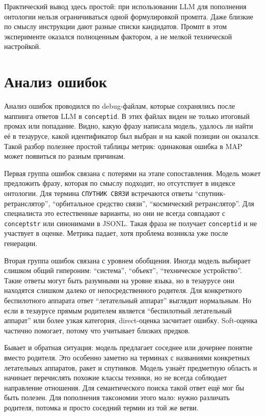 \documentclass[12pt,a4paper,oneside,openany]{report}
\begin{document}
Практический вывод здесь простой: при использовании LLM для пополнения онтологии нельзя ограничиваться одной формулировкой промпта. Даже близкие по смыслу инструкции дают разные списки кандидатов. Промпт в этом эксперименте оказался полноценным фактором, а не мелкой технической настройкой.

\chapter{Анализ ошибок}

Анализ ошибок проводился по debug-файлам, которые сохранялись после маппинга ответов LLM в \texttt{conceptid}. В этих файлах виден не только итоговый промах или попадание. Видно, какую фразу написала модель, удалось ли найти её в тезаурусе, какой идентификатор был выбран и на какой позиции он оказался. Такой разбор полезнее простой таблицы метрик: одинаковая ошибка в MAP может появиться по разным причинам.

Первая группа ошибок связана с потерями на этапе сопоставления. Модель может предложить фразу, которая по смыслу подходит, но отсутствует в индексе онтологии. Для термина \texttt{СПУТНИК СВЯЗИ} встречаются ответы ``спутник-ретранслятор'', ``орбитальное средство связи'', ``космический ретранслятор''. Для специалиста это естественные варианты, но они не всегда совпадают с \texttt{conceptstr} или синонимами в JSONL. Такая фраза не получает \texttt{conceptid} и не участвует в оценке. Метрика падает, хотя проблема возникла уже после генерации.

Вторая группа ошибок связана с уровнем обобщения. Иногда модель выбирает слишком общий гипероним: ``система'', ``объект'', ``техническое устройство''. Такие ответы могут быть разумными на уровне языка, но в тезаурусе они находятся слишком далеко от непосредственного родителя. Для конкретного беспилотного аппарата ответ ``летательный аппарат'' выглядит нормальным. Но если в тезаурусе прямым родителем является ``беспилотный летательный аппарат'' или более узкая категория, direct-оценка засчитает ошибку. Soft-оценка частично помогает, потому что учитывает близких предков.

Бывает и обратная ситуация: модель предлагает соседнее или дочернее понятие вместо родителя. Это особенно заметно на терминах с названиями конкретных летательных аппаратов, ракет и спутников. Модель узнаёт предметную область и начинает перечислять похожие классы техники, но не всегда соблюдает направление отношения. Для семантического поиска такой ответ ещё мог бы быть полезен. Для пополнения таксономии этого мало: нужно различать родителя, потомка и просто соседний термин из той же ветви.
\end{document}
